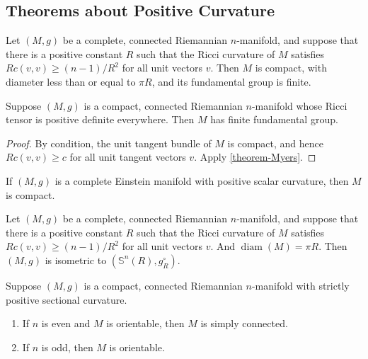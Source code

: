 \subsection{Theorems about Positive Curvature}
\label{subsection-theorem-about-positive-curvature}

\begin{theorem}[Myers]
  \label{theorem-Myers}
  Let \( (M, g) \) be a complete, connected Riemannian \( n \)-manifold, and suppose that there is a positive constant \( R \) such that the Ricci curvature of \( M \) satisfies \( Rc(v, v) \geq (n - 1) / R^2 \) for all unit vectors \( v \).
  Then \( M \) is compact, with diameter less than or equal to \( \pi R \), and its fundamental group is finite.
\end{theorem}

\begin{corollary}
  \label{corollary-Myers-1}
  Suppose \( (M, g) \) is a compact, connected Riemannian \( n \)-manifold whose Ricci tensor is positive definite everywhere.
  Then \( M \) has finite fundamental group.
\end{corollary}
\begin{proof}
  By condition, the unit tangent bundle of \( M \) is compact, and hence \( Rc(v, v) \geq c \) for all unit tangent vectors \( v \).
  Apply \ref{theorem-Myers}.
\end{proof}

\begin{corollary}
  \label{corollary-Myers-2}
  If \( (M, g) \) is a complete Einstein manifold with positive scalar curvature, then \( M \) is compact.
\end{corollary}

\begin{theorem}
  \label{theorem-Cheng-maximal-diameter}
  Let \( (M, g) \) be a complete, connected Riemannian \( n \)-manifold, and suppose that there is a positive constant \( R \) such that the Ricci curvature of \( M \) satisfies \( Rc(v, v) \geq (n - 1) / R^2 \) for all unit vectors \( v \).
  And \( \operatorname{diam}(M) = \pi R \).
  Then \( (M, g) \) is isometric to \( (\mathbb{S}^n(R), g^{\circ}_R) \).
\end{theorem}

\begin{theorem}[Synge]
  \label{theorem-Synge}
  Suppose \( (M, g) \) is a compact, connected Riemannian \( n \)-manifold with strictly positive sectional curvature.
  \begin{enumerate}
    \item If \( n \) is even and \( M \) is orientable, then \( M \) is simply connected.
    \item If \( n \) is odd, then \( M \) is orientable.
  \end{enumerate}
\end{theorem}


